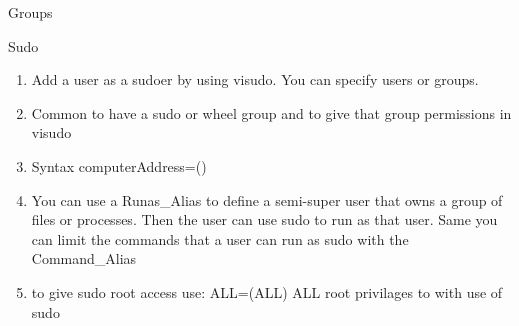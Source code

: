 \documentclass{notes}
\begin{document}
\begin{questions}{Groups}
	\begin{questionAnswer}
	\end{questionAnswer}
\end{questions}

\begin{questions}{Sudo}
	\begin{enumerate}
		\item Add a user as a sudoer by using visudo. You can specify users or groups.
		\item Common to have a sudo or wheel group and to give that group permissions in visudo
		\item Syntax \ra {} computerAddress=() 
		\item You can use a Runas\_Alias to define a semi-super user that owns a group of files or processes. Then the user can use sudo to run as that user. Same you can limit the commands that a user can run as sudo  with the Command\_Alias
		\item to give sudo root access use:  ALL=(ALL) ALL \ra root privilages to  with use of sudo
	\end{enumerate}
\end{questions}
\end{document}
